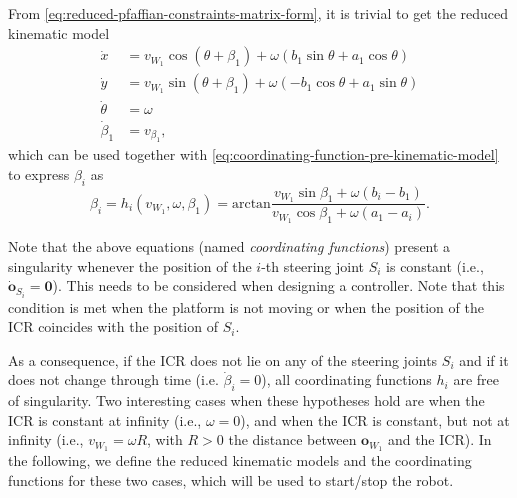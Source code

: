 From \eqref{eq:reduced-pfaffian-constraints-matrix-form}, it is trivial to get the reduced kinematic model
\begin{equation}
\label{eq:reduced-kinematic-model}
\begin{split}
    \dot{x} &= v_{W_1} \cos(\theta + \beta_1) + \omega (b_1 \sin\theta + a_1 \cos\theta) \\
    \dot{y} &= v_{W_1} \sin(\theta + \beta_1) + \omega (-b_1 \cos\theta + a_1 \sin\theta) \\
    \dot{\theta} &= \omega \\
    \dot{\beta}_1 &= v_{\beta_1},
\end{split}
\end{equation}
which can be used together with \eqref{eq:coordinating-function-pre-kinematic-model} to express $\beta_i$ as
\begin{equation}
    \label{eq:coordinating-function-post-kinematic-model}
    \beta_i = h_i(v_{W_1}, \omega, \beta_1) = \mathrm{arctan} \frac{v_{W_1}\sin\beta_1+\omega(b_i-b_1)}{v_{W_1}\cos\beta_1+\omega(a_1-a_i)}.
\end{equation}

Note that the above equations (named \textit{coordinating functions}) present a singularity whenever the position of the $i$-th steering joint $S_i$ is constant (i.e., $\dot{\bm{o}}_{S_i}=\bm{0}$). This needs to be considered when designing a controller. Note that this condition is met when the platform is not moving or when the position of the ICR coincides with the position of $S_i$. 

As a consequence, if the ICR does not lie on any of the steering joints $S_i$ and if it does not change through time (i.e. $\dot{\beta}_i = 0$), all coordinating functions $h_i$ are free of singularity. Two interesting cases when these hypotheses hold are when the ICR is constant at infinity (i.e., $\omega = 0$), and when the ICR is constant, but not at infinity (i.e., $v_{W_1} = \omega R$, with $R > 0$ the distance between $\bm{o}_{W_1}$ and the ICR). In the following, we define the reduced kinematic models and the coordinating functions for these two cases, which will be used to start/stop the robot.

